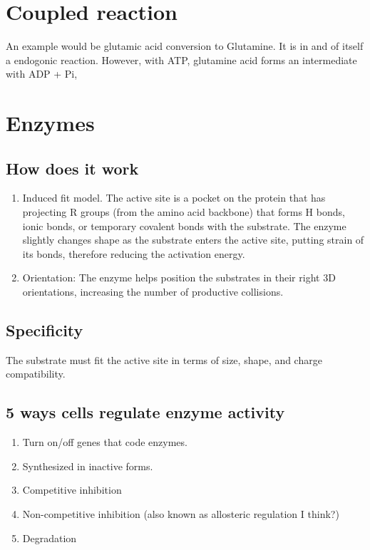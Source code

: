 \documentclass[12pt]{article}
\begin{document}
\section{Coupled reaction}
An example would be glutamic acid conversion to Glutamine. It is in and
of itself a endogonic reaction. However, with ATP, glutamine acid
forms an intermediate with ADP + Pi,  

\section{Enzymes}
\subsection{How does it work}
\begin{enumerate}
    \item Induced fit model. 
    The active site is a pocket on the protein that has projecting 
    R groups (from the amino acid backbone) that forms H bonds, 
    ionic bonds, or temporary covalent bonds with the substrate. 
    The enzyme slightly changes shape as the substrate
    enters the active site, putting strain of its bonds, therefore
    reducing the activation energy.
    \item Orientation: The enzyme helps position the substrates in 
    their right 3D orientations, increasing the number of 
    productive collisions. 
\end{enumerate}

\subsection{Specificity}
The substrate must fit the active site in terms of size, shape, and 
charge compatibility. 

\subsection{5 ways cells regulate enzyme activity}
\begin{enumerate}
    \item Turn on/off genes that code enzymes.
    \item Synthesized in inactive forms.
    \item Competitive inhibition
    \item Non-competitive inhibition (also known as allosteric regulation I think?)
    \item Degradation
\end{enumerate}
\end{document}
